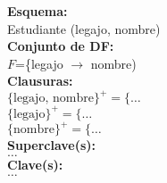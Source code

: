 \documentclass[preview]{standalone}
\begin{document}
\textbf{Esquema:}\\
Estudiante (legajo, nombre)\\

\textbf{Conjunto de DF:}\\
$F$=\{legajo $\rightarrow$ nombre)\\

\textbf{Clausuras:}\\
$\big\{\text{legajo, nombre}\big\}^+ = \big\{\dots$\\
$\big\{\text{legajo}\big\}^+ = \big\{\dots$\\
$\big\{\text{nombre}\big\}^+ = \big\{\dots$\\

\textbf{Superclave(s):}\\
$\dots$\\

\textbf{Clave(s):}\\
$\dots$
\end{document}
